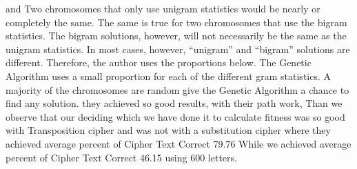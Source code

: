     and Two chromosomes that only use unigram statistics would be nearly or completely the same. The same is true for
two chromosomes that use the bigram statistics. The bigram
solutions, however, will not necessarily be the same as the
unigram statistics. In most cases, however, “unigram” and
“bigram” solutions are different. Therefore, the author uses
the proportions below. The Genetic Algorithm uses a small
proportion for each of the different gram statistics. A majority
of the chromosomes are random give the Genetic Algorithm a
chance to find any solution.
they achieved so good results, with their path work, Than we observe that our deciding which we have done it to calculate fitness was so good with Transposition cipher and was not with a substitution cipher where they achieved average percent of Cipher Text Correct 79.76
While we achieved average percent of Cipher Text Correct 46.15 using 600 letters.